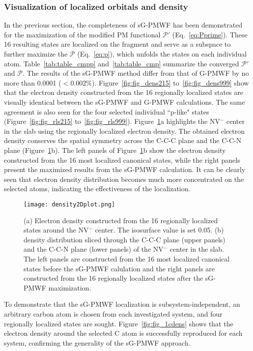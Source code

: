 \documentclass[journal=jacsat,manuscript=article]{achemso}
\begin{document}
\subsubsection{Visualization of localized orbitals and density}
In the previous section, the completeness of sG-PMWF has been demonstrated for the maximization of the modified PM functional $\mathcal{P}'$ (Eq.~\ref{eq:Pprime}). These 16 resulting states are localized on the fragment and serve as a subspace to further maximize the $\mathcal{P}$ (Eq.~\ref{eq:p}), which unfolds the states on each individual atom. Table~\ref{tab:table_cmpp} and~\ref{tab:table_cmp} summarize the converged $\mathcal{P}'$ and $\mathcal{P}$. The results of the sG-PMWF method differ from that of G-PMWF by no more than 0.0001 ($<0.002\%$). Figure~\ref{fig:fig_dens215} to~\ref{fig:fig_dens999} show that the electron density constructed from the 16 regionally localized states are visually identical between the sG-PMWF and G-PMWF calculations. The same agreement is also seen for the four selected individual ``p-like" states (Figure~\ref{fig:fig_rls215} to~\ref{fig:fig_rls999}). Figure~\ref{fig:density2D_plot}a highlights the NV$^-$ center in the slab using the regionally localized electron density. The obtained electron density conserves the spatial symmetry across the C-C-C plane and the C-C-N plane (Figure~\ref{fig:density2D_plot}b). The left panels of Figure~\ref{fig:density2D_plot}b show the electron density constructed from the 16 most localized canonical states, while the right panels present the maximized results from the sG-PMWF calculation. It can be clearly seen that electron density distribution becomes much more concentrated on the selected atoms, indicating the effectiveness of the localization.

\begin{figure}
    \centering
    \texttt{[image: density2Dplot.png]}
    \caption{(a) Electron density constructed from the 16 regionally localized states around the NV$^-$ center. The isosurface value is set 0.05. (b) density distribution sliced through the C-C-C plane (upper panels) and the C-C-N plane (lower panels) of the NV$^-$ center in the slab. The left panels are constructed from the 16 most localized canonical states before the sG-PMWF calulation and the right panels are constructed from the 16 regionally localized states after the sG-PMWF maximization.}
    \label{fig:density2D_plot}
\end{figure}

To demonstrate that the sG-PMWF localization is subsystem-independent, an arbitrary carbon atom is chosen from each investigated system, and four regionally localized states are sought. Figure~\ref{fig:fig_1cdens} shows that the electron density around the selected C atom is successfully reproduced for each system, confirming the generality of the sG-PMWF approach.
\end{document}
